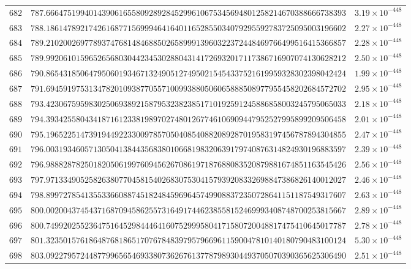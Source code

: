 \documentclass[12pt,reqno]{amsart}
\theoremstyle{remark}
\begin{document}
\begin{longtable}{clc}
$682$ & $787.6664751994014390616558092892845299610675345694801258214670388666738393$ & $3.19\times 10^{-448}$ \\
$683$ & $788.1861478921742616877156999464164011652855034079295592783725095003196602$ & $2.27\times 10^{-448}$ \\
$684$ & $789.2102002697789374768148468850265899913960322372448469766499516415366857$ & $2.28\times 10^{-448}$ \\
$685$ & $789.9920610159652656803044234530288043141726932017117386716907074130628212$ & $2.50\times 10^{-448}$ \\
$686$ & $790.8654318506479506019346713249051274950215454337521619959328302398042424$ & $1.99\times 10^{-448}$ \\
$687$ & $791.6945919753134782010938770557100993880506065888508977955458202684572702$ & $2.95\times 10^{-448}$ \\
$688$ & $793.4230675959830250693892158795323823851710192591245886858003245795065033$ & $2.18\times 10^{-448}$ \\
$689$ & $794.3934255804341871612338198970274801267746106909447952527995899209506458$ & $2.01\times 10^{-448}$ \\
$690$ & $795.1965225147391944922330097857050408540882089287019583197456787894304855$ & $2.47\times 10^{-448}$ \\
$691$ & $796.0031934605713050413844356838010668198320639179740876314824930196883597$ & $2.39\times 10^{-448}$ \\
$692$ & $796.9888287825018205061997609456267086197187688083520879881674851163545426$ & $2.56\times 10^{-448}$ \\
$693$ & $797.9713349052582638077045815402683075304157939208332698847386826140012027$ & $2.46\times 10^{-448}$ \\
$694$ & $798.8997278541355336608874518248459696457499088372350728641151187549317607$ & $2.63\times 10^{-448}$ \\
$695$ & $800.0020043745437168709458625573164917446238558152469993408748700253815667$ & $2.89\times 10^{-448}$ \\
$696$ & $800.7499202552364751645298444641607529995804171580720048817475410645017787$ & $2.78\times 10^{-448}$ \\
$697$ & $801.3235015761864876818651707678483979579669611590047810140180790483100124$ & $5.30\times 10^{-448}$ \\
$698$ & $803.0922795724487799656546933807362676137787989304493705070390365625306490$ & $2.51\times 10^{-448}$ \\

\end{longtable}
\end{document}
